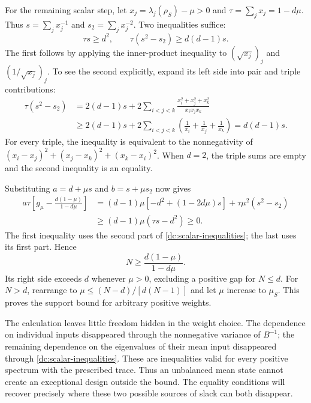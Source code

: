 \documentclass[11pt,a4paper]{article}
\numberwithin{equation}{section}
\begin{document}
For the remaining scalar step, let $x_j=\lambda_j(\rho_S)-\mu>0$ and
$\tau=\sum_jx_j=1-d\mu$.  Thus $s=\sum_jx_j^{-1}$ and
$s_2=\sum_jx_j^{-2}$.  Two inequalities suffice:
\begin{equation}
 \tau s\geq d^2,\qquad
 \tau(s^2-s_2)\geq d(d-1)s.
 \label{dc:scalar-inequalities}
\end{equation}
The first follows by applying the inner-product inequality to
$(\sqrt{x_j})_j$ and $(1/\sqrt{x_j})_j$.  To see the second explicitly,
expand its left side into pair and triple contributions:
\begin{align*}
 \tau(s^2-s_2)
 &=2(d-1)s+
   2\sum_{i<j<k}\frac{x_i^2+x_j^2+x_k^2}{x_ix_jx_k}\\
 &\geq2(d-1)s+
   2\sum_{i<j<k}\left(\frac1{x_i}+\frac1{x_j}+\frac1{x_k}\right)
 =d(d-1)s.
\end{align*}
For every triple, the inequality is equivalent to the nonnegativity of
$(x_i-x_j)^2+(x_j-x_k)^2+(x_k-x_i)^2$.  When $d=2$, the triple sums are
empty and the second inequality is an equality.

Substituting $a=d+\mu s$ and $b=s+\mu s_2$ now gives
\begin{align*}
 a\tau\left[g_\mu-\frac{d(1-\mu)}{1-d\mu}\right]
 &=(d-1)\mu[-d^2+(1-2d\mu)s]
     +\tau\mu^2(s^2-s_2)\\
 &\geq(d-1)\mu(\tau s-d^2)\geq0.
\end{align*}
The first inequality uses the second part of
\eqref{dc:scalar-inequalities}; the last uses its first part.  Hence
\begin{equation}
 N\geq\frac{d(1-\mu)}{1-d\mu}.
 \label{dc:prelimit-support}
\end{equation}
Its right side exceeds $d$ whenever $\mu>0$, excluding a positive gap for
$N\leq d$.  For $N>d$, rearrange to
$\mu\leq(N-d)/[d(N-1)]$ and let $\mu$ increase to $\mu_S$.
This proves the support bound for arbitrary positive weights.

The calculation leaves little freedom hidden in the weight choice.  The
dependence on individual inputs disappeared through the nonnegative variance
of $B^{-1}$; the remaining dependence on the eigenvalues of their mean input
disappeared through \eqref{dc:scalar-inequalities}.  These are inequalities
valid for every positive spectrum with the prescribed trace.  Thus an
unbalanced mean state cannot create an exceptional design outside the bound.
The equality conditions will recover precisely where these two possible
sources of slack can both disappear.
\end{document}
